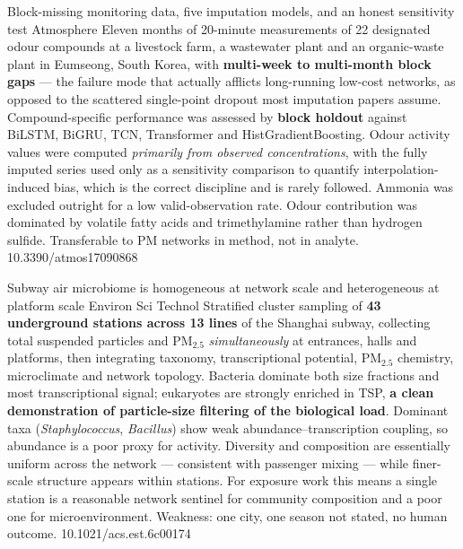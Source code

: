 \documentclass[10pt]{article}
\begin{document}
{Block-missing monitoring data, five imputation models, and an honest sensitivity test}
{Atmosphere}
{Eleven months of 20-minute measurements of 22 designated odour compounds at a livestock
farm, a wastewater plant and an organic-waste plant in Eumseong, South Korea, with
\textbf{multi-week to multi-month block gaps} --- the failure mode that actually afflicts
long-running low-cost networks, as opposed to the scattered single-point dropout most
imputation papers assume. Compound-specific performance was assessed by \textbf{block
holdout} against BiLSTM, BiGRU, TCN, Transformer and HistGradientBoosting. Odour activity
values were computed \emph{primarily from observed concentrations}, with the fully imputed
series used only as a sensitivity comparison to quantify interpolation-induced bias, which
is the correct discipline and is rarely followed. Ammonia was excluded outright for a low
valid-observation rate. Odour contribution was dominated by volatile fatty acids and
trimethylamine rather than hydrogen sulfide. Transferable to PM networks in method, not in
analyte.}
{10.3390/atmos17090868}

{Subway air microbiome is homogeneous at network scale and heterogeneous at platform scale}
{Environ Sci Technol}
{Stratified cluster sampling of \textbf{43 underground stations across 13 lines} of the
Shanghai subway, collecting total suspended particles and PM$_{2.5}$ \emph{simultaneously}
at entrances, halls and platforms, then integrating taxonomy, transcriptional potential,
PM$_{2.5}$ chemistry, microclimate and network topology. Bacteria dominate both size
fractions and most transcriptional signal; eukaryotes are strongly enriched in TSP,
\textbf{a clean demonstration of particle-size filtering of the biological load}. Dominant
taxa (\textit{Staphylococcus}, \textit{Bacillus}) show weak abundance--transcription
coupling, so abundance is a poor proxy for activity. Diversity and composition are
essentially uniform across the network --- consistent with passenger mixing --- while
finer-scale structure appears within stations. For exposure work this means a single
station is a reasonable network sentinel for community composition and a poor one for
microenvironment. Weakness: one city, one season not stated, no human outcome.}
{10.1021/acs.est.6c00174}
\end{document}
